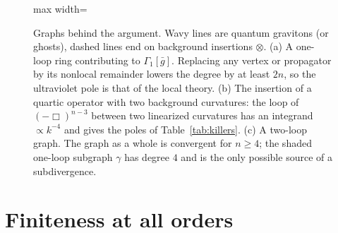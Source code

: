 \documentclass[a4paper,11pt]{article}
\begin{document}
\begin{figure}[t]
\begin{adjustbox}{max width=\linewidth}
\end{adjustbox}
\caption{Graphs behind the argument. Wavy lines are quantum gravitons (or ghosts), dashed lines end on background insertions $\otimes$. (a) A one-loop ring contributing to $\Gamma_1[\bar g]$. Replacing any vertex or propagator by its nonlocal remainder lowers the degree by at least $2n$, so the ultraviolet pole is that of the local theory. (b) The insertion of a quartic operator with two background curvatures: the loop of $(-\Box)^{n-3}$ between two linearized curvatures has an integrand $\propto k^{-4}$ and gives the poles of Table~\ref{tab:killers}. (c) A two-loop graph. The graph as a whole is convergent for $n\ge4$; the shaded one-loop subgraph $\gamma$ has degree $4$ and is the only possible source of a subdivergence.}
\label{fig:diagrams}
\end{figure}

\section{Finiteness at all orders}
\label{sec:finite}
\end{document}
